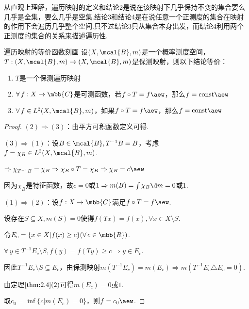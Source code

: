 从直观上理解，遍历映射的定义和结论2是说在该映射下几乎保持不变的集合要么几乎是全集，要么几乎是空集.结论3和结论4是在说任意一个正测度的集合在映射的作用下会遍历几乎整个空间.只不过结论3只从集合本身出发，而结论4利用两个正测度的集合的关系来描述遍历性.


\begin{theorem}{遍历映射的等价函数刻画}
    \wideline
    设$(X,\mcal{B},m)$是一个概率测度空间，$T:(X,\mcal{B},m)\to(X,\mcal{B},m)$是保测映射，则以下结论等价：
    \begin{enumerate}[(1)]
        \item $T$是一个保测遍历映射
        \item $\forall\, f:X\to\mbb{C}$是可测函数，若$f\circ T=f\aew$，那么$f=\mathrm{const}\aew$
        \item $\forall\, f\in L^2(X,\mcal{B},m)$，如果$f\circ T=f\aew$，那么$f=\mathrm{const}\aew$
    \end{enumerate}
\end{theorem}
\begin{proof}
    $(2)\Rightarrow(3)$：由平方可积函数定义可得.\par
    $(3)\Rightarrow(1)$：设$B\in\mcal{B},T^{-1}B=B$，考虑$f=\chi_B\in L^2(X,\mcal{B},m)$.\par
    $\Rightarrow \chi_{T^{-1}B}=\chi_B \Rightarrow \chi_{B}\circ T=\chi_B \Rightarrow \chi_B=c \aew$\par
    因为$\chi_B$是特征函数，故$c=0$或$1\Rightarrow m(B)=\int\chi_B\d m=0$或$1$.\par
    $(1)\Rightarrow (2)$：设$f:X\to\mbb{C}$满足$f\circ T=f\aew$.\par
    设存在$S\subseteq X,m(S)=0$使得$f(Tx)=f(x),\forall x\in X\setminus S$.\par
    令$E_c=\{x\in X|f(x)\geq c\}(\forall\, c\in\mbb{R})$.\par
    $\forall\, y\in T^{-1}E_c\setminus S,f(y)=f(Ty)\geq c\Rightarrow y\in E_c$.\par
    因此$T^{-1}E_c\setminus S\subseteq E_c$，由保测映射$m(T^{-1}E_c)=m(E_c)\Rightarrow m(T^{-1}E_c\triangle E_c=0)$.\par
    由定理$\ref{thm:2.4}(2)$可得$m(E_c)=0$或$1$.\par
    取$c_0=\inf\{c|m(E_c)=0\}$，则$f=c_0 \aew$.
\end{proof}

